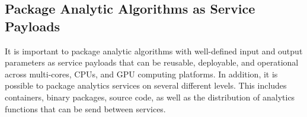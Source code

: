 
\subsection{Package Analytic Algorithms as Service Payloads}
\label{sec:package}

It is important to package analytic algorithms with well-defined
input and output parameters as service payloads that can be reusable,
deployable, and operational across multi-cores, CPUs, and GPU
computing platforms.
In addition, it is possible to package analytics services on several 
different levels. This includes containers, binary packages, source
code, as well as the distribution of analytics functions that can be
send between services. 


